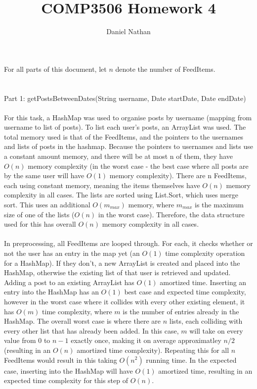 \documentclass{article}
\author{Daniel Nathan}
\title{COMP3506 Homework 4}
\begin{document}
	For all parts of this document, let $n$ denote the number of FeedItems.
	\\ \\ \\
	Part 1: getPostsBetweenDates(String username, Date startDate, Date endDate) \\ \\
	For this task, a HashMap was used to organise posts by username (mapping from username to list of posts). To list each user's posts, an ArrayList was used. The total memory used is that of the FeedItems, and the pointers to the usernames and lists of posts in the hashmap. Because the pointers to usernames and lists use a constant amount memory, and there will be at most n of them, they have $O(n)$ memory complexity (in the worst case - the best case where all posts are by the same user will have $O(1)$ memory complexity). There are n FeedItems, each using constant memory, meaning the items themselves have $O(n)$ memory complexity in all cases. The lists are sorted using List.Sort, which uses merge sort. This uses an additional $O(m_{max})$ memory, where $m_{max}$ is the maximum size of one of the lists ($O(n)$ in the worst case). Therefore, the data structure used for this has overall $O(n)$ memory complexity in all cases. \\ \\
	In preprocessing, all FeedItems are looped through. For each, it checks whether or not the user has an entry in the map yet (an $O(1)$ time complexity operation for a HashMap). If they don't, a new ArrayList is created and placed into the HashMap, otherwise the existing list of that user is retrieved and updated. Adding a post to an existing ArrayList has $O(1)$ amortized time. Inserting an entry into the HashMap has an $O(1)$ best case and expected time complexity, however in the worst case where it collides with every other existing element, it has $O(m)$ time complexity, where $m$ is the number of entries already in the HashMap. The overall worst case is where there are $n$ lists, each colliding with every other list that has already been added. In this case, $m$ will take on every value from $0$ to $n - 1$ exactly once, making it on average approximatley $n/2$ (resulting in an $O(n)$ amortized time complexity). Repeating this for all $n$ FeedItems would result in this taking $O(n^2)$ running time. In the expected case, inserting into the HashMap will have $O(1)$ amortized time, resulting in an expected time complexity for this step of $O(n)$. \\ \\
\end{document}
